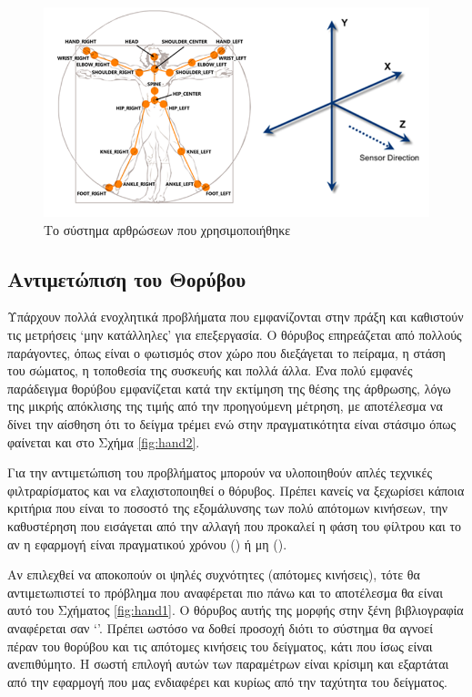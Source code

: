 \begin{figure}[H]
    \centering
    \includegraphics[width=.9\textwidth, keepaspectratio]{fig/kinect-joints.png}
    \caption{Το σύστημα αρθρώσεων που χρησιμοποιήθηκε\protect\footnotemark}
    \label{fig:kinect-joints}
\end{figure}

\subsection{Αντιμετώπιση του Θορύβου}

Υπάρχουν πολλά ενοχλητικά προβλήματα που εμφανίζονται στην πράξη και καθιστούν τις μετρήσεις \lq μην κατάλληλες\rq\: για επεξεργασία. Ο θόρυβος επηρεάζεται από πολλούς παράγοντες, όπως είναι ο φωτισμός στον χώρο που διεξάγεται το πείραμα, η στάση του σώματος, η τοποθεσία της συσκευής και πολλά άλλα. Ένα πολύ εμφανές παράδειγμα θορύβου εμφανίζεται κατά την εκτίμηση της θέσης της άρθρωσης, λόγω της μικρής απόκλισης της τιμής από την προηγούμενη μέτρηση, με αποτέλεσμα να δίνει την αίσθηση ότι το δείγμα τρέμει ενώ στην πραγματικότητα είναι στάσιμο όπως φαίνεται και στο Σχήμα \ref{fig:hand2}.

Για την αντιμετώπιση του προβλήματος μπορούν να υλοποιηθούν απλές τεχνικές φιλτραρίσματος και να ελαχιστοποιηθεί ο θόρυβος. Πρέπει κανείς να ξεχωρίσει κάποια κριτήρια που είναι το ποσοστό της εξομάλυνσης των πολύ απότομων κινήσεων, την καθυστέρηση που εισάγεται από την αλλαγή που προκαλεί η φάση του φίλτρου και το αν η εφαρμογή είναι πραγματικού χρόνου () ή μη ().

Αν επιλεχθεί να αποκοπούν οι ψηλές συχνότητες (απότομες κινήσεις), τότε θα αντιμετωπιστεί το πρόβλημα που αναφέρεται πιο πάνω και το αποτέλεσμα θα είναι αυτό του Σχήματος \ref{fig:hand1}. Ο θόρυβος αυτής της μορφής στην ξένη βιβλιογραφία αναφέρεται σαν \lq {}\rq . Πρέπει ωστόσο να δοθεί προσοχή διότι το σύστημα θα αγνοεί πέραν του θορύβου και τις απότομες κινήσεις του δείγματος, κάτι που ίσως είναι ανεπιθύμητο. Η σωστή επιλογή αυτών των παραμέτρων είναι κρίσιμη και εξαρτάται από την εφαρμογή που μας ενδιαφέρει και κυρίως από την ταχύτητα του δείγματος.

